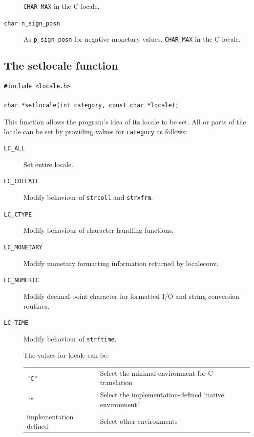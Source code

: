 \begin{description}
    \texttt{CHAR\_MAX} in the C locale.

   

   \item[\texttt{char  n\_sign\_posn}] As \texttt{p\_sign\_posn} for negative monetary
    values.  \texttt{CHAR\_MAX} in the C locale.
  \end{description}

  \subsection{The setlocale function}
   

   \begin{Verbatim}
#include <locale.h>

char *setlocale(int category, const char *locale);
\end{Verbatim}

   This function allows the program's idea of its locale to  be
    set.   All  or  parts  of the locale can be set by providing
    values for \texttt{category} as follows:


   \begin{description}
    \item[\texttt{LC\_ALL}] Set entire locale.

    \item[\texttt{LC\_COLLATE}] Modify behaviour of \texttt{strcoll} and \texttt{strxfrm}.

    \item[\texttt{LC\_CTYPE}] Modify behaviour of character-handling functions.

    \item[\texttt{LC\_MONETARY}] Modify  monetary  formatting  information   returned   by
     localeconv.

    \item[\texttt{LC\_NUMERIC}] Modify decimal-point  character  for  formatted  I/O  and
     string conversion routines.

    \item[\texttt{LC\_TIME}] 
     Modify behaviour of \texttt{strftime}.


     The values for locale can be:


     \begin{tabular}{lp{\textwidth}}
       \texttt{"C"} & Select the minimal environment for C translation
      \\

       \texttt{""} & Select the implementation-defined `native environment'
      \\

       implementation defined & Select other environments
      \\
\end{tabular}


    
   \end{description}

